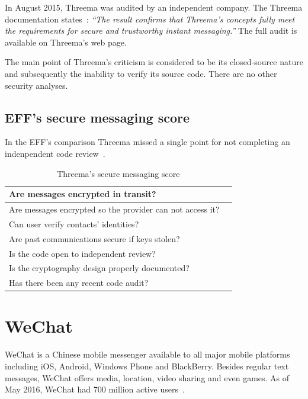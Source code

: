 \documentclass[thesis=M,english]{FITthesis}[2012/10/20]
\newcommand{\cmark}{\ding{51}}%
\newcommand{\xmark}{\ding{55}}%
\begin{document}
In August 2015, Threema was audited by an independent company. The Threema documentation states~\cite{threema-audit}: \emph{``The result confirms that Threema's concepts fully meet the requirements for secure and trustworthy instant messaging.''} The full audit is available on Threema's web page.

The main point of Threema's criticism is considered to be its closed-source nature and subsequently the inability to verify its source code. There are no other security analyses.

\subsection{EFF's secure messaging score}

In the EFF's comparison Threema missed a single point for not completing an indenpendent code review~\cite{eff-score}.

\begin{table}[htb]
	\centering
	\caption{Threema's secure messaging score}
	\label{my-label}
	\begin{tabular}{|l|l|}
		\hline
		Are messages encrypted in transit? & \cmark \\\hline
		Are messages encrypted so the provider can not access it? & \cmark \\ \hline
		Can user verify contacts' identities? & \cmark \\ \hline
		Are past communications secure if keys stolen? & \cmark \\ \hline
		Is the code open to independent review? & \xmark \\ \hline
		Is the cryptography design properly documented? & \cmark \\ \hline
		Has there been any recent code audit? & \cmark \\ \hline
	\end{tabular}
\end{table}


\section{WeChat}

WeChat is a Chinese mobile messenger available to all major mobile platforms including iOS, Android, Windows Phone and BlackBerry. Besides regular text messages, WeChat offers media, location, video sharing and even games. As of May 2016, WeChat had 700 million active users~\cite{wechat-users}.
\end{document}
